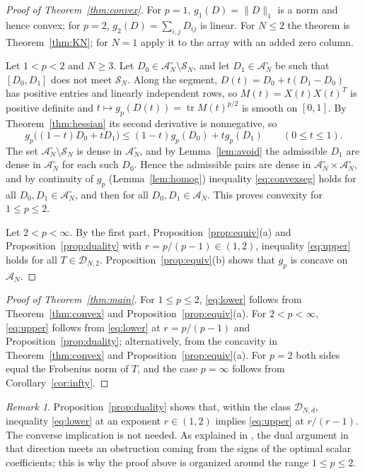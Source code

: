 \documentclass[11pt]{amsart}
\theoremstyle{definition}
\theoremstyle{remark}
\newtheorem{remark}[theorem]{Remark}
\numberwithin{equation}{section}
\newcommand{\tr}{\operatorname{tr}}
\newcommand{\cA}{\mathcal{A}}
\newcommand{\cD}{\mathcal{D}}
\begin{document}
\begin{proof}[Proof of Theorem~\ref{thm:convex}]
For $p=1$, $g_1(D)=\|D\|_1$ is a norm and hence convex; for $p=2$, $g_2(D)=\sum_{i,j}D_{ij}$ is linear. For $N\le2$ the theorem is Theorem~\ref{thm:KN}; for $N=1$ apply it to the array with an added zero column.

Let $1<p<2$ and $N\ge3$. Let $D_0\in\cA_N^\circ\setminus\mathcal S_N$, and let $D_1\in\cA_N^\circ$ be such that $[D_0,D_1]$ does not meet $\mathcal S_N$. Along the segment, $D(t)=D_0+t(D_1-D_0)$ has positive entries and linearly independent rows, so $M(t)=X(t)X(t)^T$ is positive definite and $t\mapsto g_p(D(t))=\tr M(t)^{p/2}$ is smooth on $[0,1]$. By Theorem~\ref{thm:hessian} its second derivative is nonnegative, so
\begin{equation}\label{eq:convexseg}
g_p\bigl((1-t)D_0+tD_1\bigr)\le(1-t)g_p(D_0)+tg_p(D_1)\qquad(0\le t\le1).
\end{equation}
The set $\cA_N^\circ\setminus\mathcal S_N$ is dense in $\cA_N^\circ$, and by Lemma~\ref{lem:avoid} the admissible $D_1$ are dense in $\cA_N^\circ$ for each such $D_0$. Hence the admissible pairs are dense in $\cA_N^\circ\times\cA_N^\circ$, and by continuity of $g_p$ (Lemma~\ref{lem:homog}) inequality \eqref{eq:convexseg} holds for all $D_0,D_1\in\cA_N^\circ$, and then for all $D_0,D_1\in\cA_N$. This proves convexity for $1\le p\le2$.

Let $2<p<\infty$. By the first part, Proposition~\ref{prop:equiv}(a) and Proposition~\ref{prop:duality} with $r=p/(p-1)\in(1,2)$, inequality \eqref{eq:upper} holds for all $T\in\cD_{N,2}$. Proposition~\ref{prop:equiv}(b) shows that $g_p$ is concave on $\cA_N$.
\end{proof}

\begin{proof}[Proof of Theorem~\ref{thm:main}]
For $1\le p\le2$, \eqref{eq:lower} follows from Theorem~\ref{thm:convex} and Proposition~\ref{prop:equiv}(a). For $2<p<\infty$, \eqref{eq:upper} follows from \eqref{eq:lower} at $r=p/(p-1)$ and Proposition~\ref{prop:duality}; alternatively, from the concavity in Theorem~\ref{thm:convex} and Proposition~\ref{prop:equiv}(a). For $p=2$ both sides equal the Frobenius norm of $T$, and the case $p=\infty$ follows from Corollary~\ref{cor:infty}.
\end{proof}

\begin{remark}
Proposition~\ref{prop:duality} shows that, within the class $\cD_{N,d}$, inequality \eqref{eq:lower} at an exponent $r\in(1,2)$ implies \eqref{eq:upper} at $r/(r-1)$. The converse implication is not needed. As explained in \cite[Section~2.2]{Aud08}, the dual argument in that direction meets an obstruction coming from the signs of the optimal scalar coefficients; this is why the proof above is organized around the range $1\le p\le2$.
\end{remark}
\end{document}
